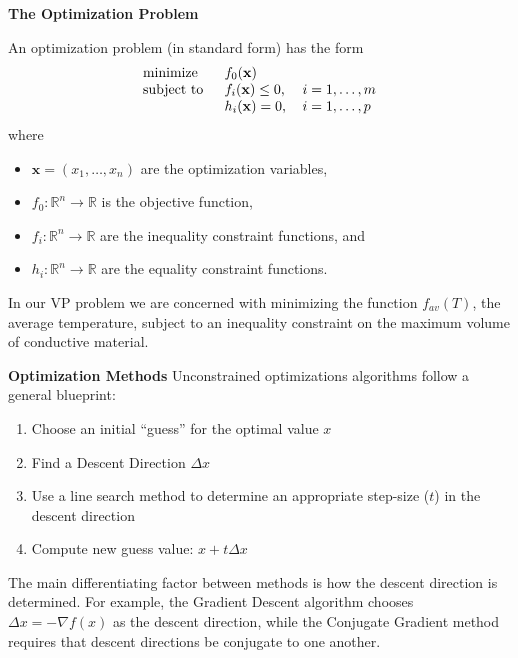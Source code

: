 \documentclass[final]{beamer}
\begin{document}
\begin{frame}{\textbf{The Optimization Problem}}
	\pause
	\begin{definition}
		An optimization problem (in standard form) has the form
		\begin{equation}
			\begin{tabular}{lll}
				\text{minimize }   & $f_0(\mathbf{x})$        &                 \\
				\text{subject to } & $f_i(\mathbf{x})\leq 0$, & $i=1,\ldots, m$ \\
				& $h_i(\mathbf{x}) = 0$,   & $i=1,\ldots, p$ 
			\end{tabular}\label{Optimization}
		\end{equation}
		where
		\begin{itemize}
			\item $\mathbf{x}=\left(x_1,\ldots,x_n\right)$ are the optimization variables,
			\item $f_0 : \mathbb{R}^n\rightarrow\mathbb{R}$ is the objective function,
			\item $f_i : \mathbb{R}^n\rightarrow\mathbb{R}$ are the inequality constraint functions, and
			\item $h_i : \mathbb{R}^n\rightarrow\mathbb{R}$ are the equality constraint functions.
		\end{itemize}
	\end{definition}
	\pause
	In our VP problem we are concerned with minimizing the function $f_{av}(T)$, the average temperature, subject to an inequality constraint on the maximum volume of conductive material.
\end{frame}

\begin{frame}{\textbf{Optimization Methods}}
	Unconstrained optimizations algorithms follow a general blueprint:\pause
	\begin{enumerate}
		\item Choose an initial ``guess'' for the optimal value $x$\pause
		\item Find a Descent Direction $\Delta x$\pause
		\item Use a line search method to determine an appropriate step-size ($t$) in the descent direction\pause
		\item Compute new guess value: $x+t\Delta x$\pause
	\end{enumerate}
	\pause
	\vfill
	The main differentiating factor between methods is how the descent direction is determined.\pause
	\vfill
	For example, the Gradient Descent algorithm chooses $\Delta x=-\nabla f(x)$ as the descent direction, while the Conjugate Gradient method requires that descent directions be conjugate to one another.
\end{frame}
\end{document}

